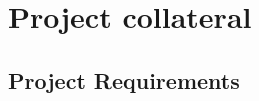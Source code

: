 \appendix

\chapter{Project collateral}
\label{ch:project-collateral}

\section{Project Requirements}
\label{sec:project-requirements}


